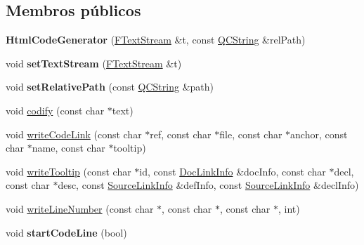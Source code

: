 \subsection*{Membros públicos}
\begin{DoxyCompactItemize}
\item 
\hypertarget{class_html_code_generator_a8f7a4670e31644dfa1721de745151b1d}{{\bfseries Html\-Code\-Generator} (\hyperlink{class_f_text_stream}{F\-Text\-Stream} \&t, const \hyperlink{class_q_c_string}{Q\-C\-String} \&rel\-Path)}\label{class_html_code_generator_a8f7a4670e31644dfa1721de745151b1d}

\item 
\hypertarget{class_html_code_generator_aaa10b058cc2604073709f59c74d1b36a}{void {\bfseries set\-Text\-Stream} (\hyperlink{class_f_text_stream}{F\-Text\-Stream} \&t)}\label{class_html_code_generator_aaa10b058cc2604073709f59c74d1b36a}

\item 
\hypertarget{class_html_code_generator_a8da29834bee1e0ff4dd5343679d8a41f}{void {\bfseries set\-Relative\-Path} (const \hyperlink{class_q_c_string}{Q\-C\-String} \&path)}\label{class_html_code_generator_a8da29834bee1e0ff4dd5343679d8a41f}

\item 
void \hyperlink{class_html_code_generator_a96b26b0cb63719fd5370a9a04d2ebb38}{codify} (const char $\ast$text)
\item 
void \hyperlink{class_html_code_generator_ab3866da052a840c400b4990dd2ddf61b}{write\-Code\-Link} (const char $\ast$ref, const char $\ast$file, const char $\ast$anchor, const char $\ast$name, const char $\ast$tooltip)
\item 
void \hyperlink{class_html_code_generator_acc6f74ac2670196668c05d4156eec872}{write\-Tooltip} (const char $\ast$id, const \hyperlink{struct_doc_link_info}{Doc\-Link\-Info} \&doc\-Info, const char $\ast$decl, const char $\ast$desc, const \hyperlink{struct_source_link_info}{Source\-Link\-Info} \&def\-Info, const \hyperlink{struct_source_link_info}{Source\-Link\-Info} \&decl\-Info)
\item 
void \hyperlink{class_html_code_generator_a68e608aa3fa63507e7545589c3325a91}{write\-Line\-Number} (const char $\ast$, const char $\ast$, const char $\ast$, int)
\item 
\hypertarget{class_html_code_generator_aa76dc2000bd743981f13bb8953b51499}{void {\bfseries start\-Code\-Line} (bool)}\label{class_html_code_generator_aa76dc2000bd743981f13bb8953b51499}


\end{DoxyCompactItemize}
